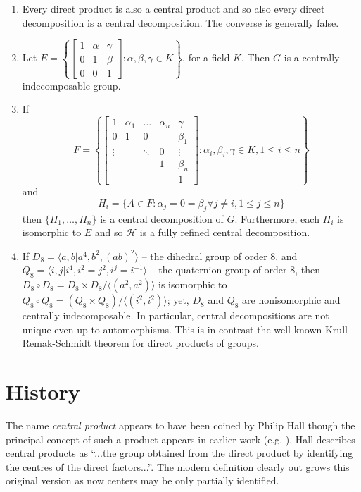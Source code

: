\documentclass[12pt]{article}
\begin{document}
\begin{enumerate}
\item
Every direct product is also a central product and so also every direct decomposition is a 
central decomposition.  The converse is generally false.
\item
Let $E=\left\{\begin{bmatrix} 1 & \alpha & \gamma\\ 0 & 1 & \beta \\ 0 & 0 & 1\end{bmatrix}:
\alpha,\beta,\gamma\in K\right\}$, for a field $K$.  Then $G$ is a centrally indecomposable group.
\item
If
$$F=\left\{\begin{bmatrix} 
1 & \alpha_1 & \dots & \alpha_n & \gamma\\ 
0 & 1 & 0 & & \beta_1\\
\vdots & &\ddots & 0 & \vdots\\
 &  &  & 1 & \beta_n \\ 
 &  & & & 1 \end{bmatrix}:
\alpha_i,\beta_i,\gamma\in K,1\leq i\leq n\right\}$$
and 
$$H_i = \{A\in F: \alpha_j=0=\beta_j \forall j\neq i, 1\leq j\leq n\}$$
then $\{H_1,\dots,H_n\}$ is a central decomposition of $G$.  Furthermore, each
$H_i$ is isomorphic to $E$ and so $\mathcal{H}$ is a fully refined central decomposition.
\item
If $D_8=\langle a,b | a^4,b^2,(ab)^2\rangle$ -- the dihedral group of order 8,
and $Q_8=\langle i,j | i^4, i^2=j^2, i^j=i^{-1}\rangle$ -- the quaternion group of order $8$, then
$D_8 \circ D_8 = D_8 \times D_8/\langle (a^2,a^2)\rangle$ is isomorphic to 
$Q_8\circ Q_8=(Q_8\times Q_8)/\langle (i^2,i^2)\rangle$; yet, $D_8$ and $Q_8$ are nonisomorphic and
centrally indecomposable.  In particular, central decompositions are not unique even up to automorphisms.
This is in contrast the well-known Krull-Remak-Schmidt theorem for direct products of groups.
\end{enumerate}



\section{History}

The name \emph{central product} appears to have been coined by Philip Hall \cite[Section 3.2]{Hall} 
though the principal concept of such a product appears in earlier work (e.g. \cite[Theorem II]{Neumann}).
Hall describes central products as ``...the group obtained from the direct product by identifying
the centres of the direct factors...''.   The modern definition clearly out grows this original version 
as now centers may be only partially identified.
\end{document}
